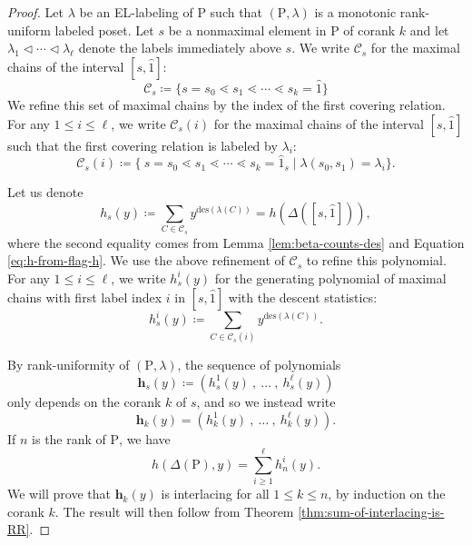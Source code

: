 \documentclass[11pt,a4paper]{amsart}
\theoremstyle{results}
\theoremstyle{definitions}
\def\P{\mathbb{P}}
\def\calC{\mathcal{C}}
\newcommand{\des}{\mathrm{des}}
\newcommand{\un}{\hat{1}}
\renewcommand{\P}{\mathrm{P}}
\renewcommand{\hat}{\widehat}
\begin{document}
\begin{proof}
Let $\lambda$ be an EL-labeling of $\P$ such that $(\P, \lambda)$ is a monotonic rank-uniform labeled poset. Let $s$ be a nonmaximal element in $\P$ of corank $k$ and let $\lambda_1  \vartriangleleft \cdots \vartriangleleft \lambda_{\ell}$ denote the labels immediately above $s$. We write $\calC_s$ for the maximal chains of the interval $[s, \un]$: 
\[
\calC_{s} \coloneqq \{ s = s_0 \lessdot s_1 \lessdot \cdots \lessdot s_k = \un \}
\] 
We refine this set of maximal chains by the index of the first covering relation. For any $1 \leqslant i \leqslant \ell$, we write $\calC_{s}(i)$ for the maximal chains of the interval $[s, \un]$ such that the first covering relation is labeled by $\lambda_i$: 
\[
\calC_{s}(i) \coloneqq \{\: s = s_0 \lessdot s_1 \lessdot \cdots \lessdot s_k = \un_{s} \mid \lambda(s_0, s_1) = \lambda_i\}. 
\] 

Let us denote 
\[
h_s(y) \coloneqq \sum_{C \in \calC_s} y^{\des(\lambda(C))} = h(\Delta([s, \un])),
\] 
where the second equality comes from Lemma \ref{lem:beta-counts-des} and Equation \eqref{eq:h-from-flag-h}. We use the above refinement of $\calC_{s}$ to refine this polynomial. For any $1 \leqslant i \leqslant \ell$, we write $h_{s}^{i}(y)$ for the generating polynomial of maximal chains with first label index $i$ in $[s, \un]$ with the descent statistics: 
\[
h_{s}^i(y) \coloneqq \sum_{C \in \calC_s(i)} y^{\des(\lambda(C))}. 
\] 

By rank-uniformity of $(\P, \lambda)$, the sequence of polynomials
\[
\mathbf{h}_{s}(y) \coloneqq (h_{s}^{1}(y)\: , \: \ldots \:, \: h_{s}^{\ell}(y))
\] only depends on the corank $k$ of $s$, and so we instead write
\[
\mathbf{h}_{k}(y) = (h^1_{k}(y)\: , \: \ldots \:, \: h^{\ell}_{k}(y)).
\]
If $n$ is the rank of $\P$, we have 
\[
h(\Delta(\P), y) = \sum_{i\geqslant 1}^{\ell} h^i_{n}(y).
\] 
We will prove that $\mathbf{h}_k(y)$ is interlacing for all $1 \leqslant k \leqslant n$, by induction on the corank $k$. The result will then follow from Theorem \ref{thm:sum-of-interlacing-is-RR}.


\end{proof}
\end{document}
